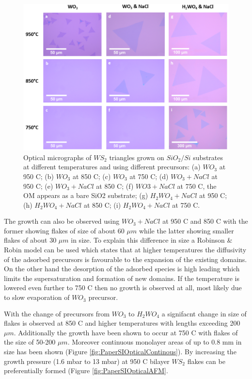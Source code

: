 \begin{figure}[h]
\begin{center}
\includegraphics[scale=0.3]{PaperOptical.png}
\caption{Optical micrographs of $WS_2$ triangles grown on $SiO_2/Si$ substrates at different temperatures and using different precursors: (a) $WO_3$ at  950 {\degree}C; (b) $WO_3$ at 850 {\degree}C; (c) $WO_3$ at 750 {\degree}C; (d) $WO_3 + NaCl$ at 950 {\degree}C; (e) $WO_3+NaCl$ at 850 {\degree}C; (f) $WO3 + NaCl$ at 750 {\degree}C, the OM appears as a bare SiO2 substrate; (g) $H_2WO_4 + NaCl$ at 950 {\degree}C; (h) $H_2WO_4 + NaCl$ at 850 {\degree}C; (i) $H_2WO_4 + NaCl$ at 750 {\degree}C.}
\label{fig:PaperOptical}
\end{center}
\end{figure}

The growth can also be observed using $WO_3 + NaCl$ at 950 {\degree}C and 850 {\degree}C with the former showing flakes of size of about 60 $\mu m$ while the latter showing smaller flakes of about 30 $\mu m$ in size. To explain this difference in size a Robinson \& Robin model can be used which states that at higher temperatures the diffusivity of the adsorbed precursors is favourable to the expansion of the existing domains. On the other hand the desorption of the adsorbed species is high leading which limits the supersaturation and formation of new domains. If the temperature is lowered even further to 750 {\degree}C then no growth is observed at all, most likely due to slow evaporation of $WO_3$ precursor. 

With the change of precursors from $WO_3$ to $H_2WO_4$ a signifacnt change in size of flakes is observed at 850 {\degree}C  and higher temperatures with lengths exceeding 200 $\mu m$. Additionally the growth have been shown to occur at 750 {\degree}C with flakes of the size of 50-200 $\mu m$. Moreover continuous monolayer areas of up to 0.8 mm in size has been shown (Figure \ref{fig:PaperSIOpticalContinous}). By increasing the growth pressure (1.6 mbar to 13 mbar) at 950 {\degree}C bilayer $WS_2$ flakes can be preferentially formed (Figure \ref{fig:PaperSIOpticalAFM}.

